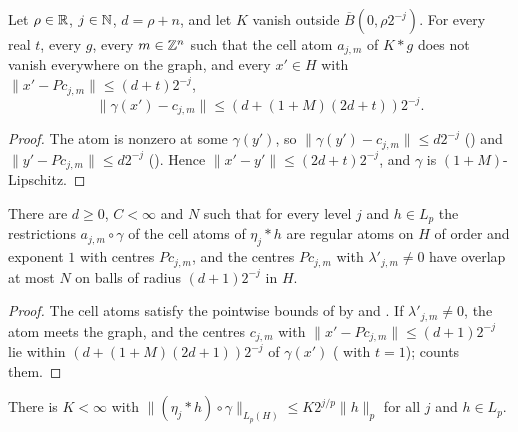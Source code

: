 \begin{lemma}
\label{lem:trace-atom-centres}
\leanok
{}
Let $\rho \in \mathbb{R}$, $j \in \mathbb{N}$, $d = \rho + n$, and let $K$ vanish outside
$\overline{B}(0, \rho 2^{-j})$. For every real $t$, every $g$, every $m \in \mathbb{Z}^n$ such that the cell
atom $a_{j,m}$ of $K * g$ does not vanish everywhere on the graph, and every $x' \in H$ with
$\|x' - P c_{j,m}\| \leq (d + t) 2^{-j}$,
\[
  \|\gamma(x') - c_{j,m}\| \leq (d + (1 + M)(2d + t)) 2^{-j}.
\]
\end{lemma}

\begin{proof}
\leanok
The atom is nonzero at some $\gamma(y')$, so $\|\gamma(y') - c_{j,m}\| \leq d 2^{-j}$
() and $\|y' - P c_{j,m}\| \leq d 2^{-j}$ ().
Hence $\|x' - y'\| \leq (2d + t) 2^{-j}$, and $\gamma$ is $(1 + M)$-Lipschitz.
\end{proof}

\begin{lemma}
\label{lem:trace-atoms}
\leanok
{}
There are $d \geq 0$, $C < \infty$ and $N$ such that for every level $j$ and $h \in L_p$ the
restrictions $a_{j,m} \circ \gamma$ of the cell atoms of $\eta_j * h$ are regular atoms on $H$ of
order and exponent $1$ with centres $P c_{j,m}$, and the centres $P c_{j,m}$ with
$\lambda'_{j,m} \neq 0$ have overlap at most $N$ on balls of radius $(d + 1) 2^{-j}$ in $H$.
\end{lemma}

\begin{proof}
\leanok
The cell atoms satisfy the pointwise bounds of  by
 and . If $\lambda'_{j,m} \neq 0$, the
atom meets the graph, and the centres $c_{j,m}$ with $\|x' - P c_{j,m}\| \leq (d + 1) 2^{-j}$ lie
within $(d + (1 + M)(2d + 1)) 2^{-j}$ of $\gamma(x')$ ( with $t = 1$);
 counts them.
\end{proof}

\begin{lemma}
\label{lem:trace-terms-lp}
\leanok
{}
There is $K < \infty$ with $\|(\eta_j * h) \circ \gamma\|_{L_p(H)} \leq K 2^{j/p} \|h\|_p$ for all
$j$ and $h \in L_p$.
\end{lemma}

